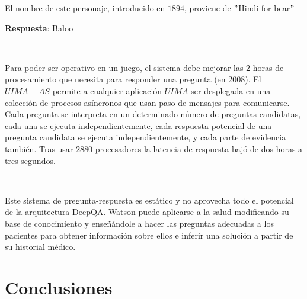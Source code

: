 \documentclass[paper=a4, fontsize=10pt]{scrartcl} %
\numberwithin{equation}{section} %
\numberwithin{figure}{section} %
\numberwithin{table}{section} %
\begin{document}
\begin{center}
El nombre de este personaje, introducido en $1894$, proviene de $"$Hindi for bear$"$

\textbf{Respuesta}: Baloo
\end{center}

\

Para poder ser operativo en un juego, el sistema debe mejorar las $2$ horas de procesamiento que necesita para responder una pregunta (en $2008$).
El $UIMA-AS$ permite a cualquier aplicación $UIMA$ ser desplegada en una colección de procesos asíncronos que usan paso de mensajes para comunicarse.
Cada pregunta se interpreta en un determinado número de preguntas candidatas, cada una se ejecuta independientemente, cada respuesta potencial de una pregunta candidata se ejecuta independientemente, y cada parte de evidencia también.
Tras usar $2880$ procesadores la latencia de respuesta bajó de dos horas a tres segundos. %

\

Este sistema de pregunta-respuesta es estático y no aprovecha todo el potencial de la arquitectura DeepQA.
Watson puede aplicarse a la salud modificando su base de conocimiento y enseñándole a hacer las preguntas adecuadas a los pacientes para obtener información sobre ellos e inferir una solución a partir de su historial médico.




\section{Conclusiones}




\newpage
\end{document}
